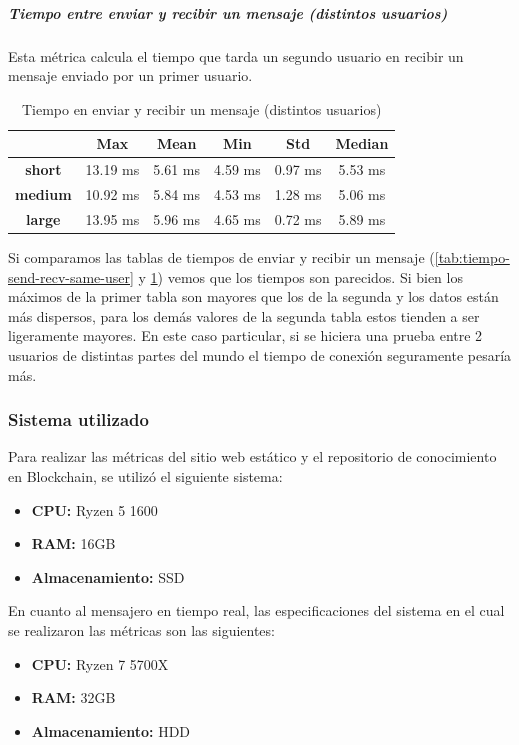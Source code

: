 \subparagraph{Tiempo entre enviar y recibir un mensaje (distintos usuarios)}

Esta métrica calcula el tiempo que tarda un segundo usuario en recibir un mensaje enviado por un primer usuario.

\setlength\tabcolsep{10pt}
\begin{table}[H]
    \centering
    \begin{tabular}{|c|c|c|c|c|c|}
    \hline
    & \textbf{Max} & \textbf{Mean} & \textbf{Min} & \textbf{Std} & \textbf{Median} \\
    \hline
    \textbf{short} & 13.19 ms & 5.61 ms & 4.59 ms & 0.97 ms & 5.53 ms \\
    \hline
    \textbf{medium} & 10.92 ms & 5.84 ms & 4.53 ms & 1.28 ms & 5.06 ms \\
    \hline
    \textbf{large} & 13.95 ms & 5.96 ms & 4.65 ms & 0.72 ms & 5.89 ms \\
    \hline
    \end{tabular}
    \caption{Tiempo en enviar y recibir un mensaje (distintos usuarios)}
    \label{tab:tiempo-send-recv-diff-user}
\end{table}

Si comparamos las tablas de tiempos de enviar y recibir un mensaje (\ref{tab:tiempo-send-recv-same-user} y \ref{tab:tiempo-send-recv-diff-user}) vemos que los tiempos son parecidos. Si bien los máximos de la primer tabla son mayores que los de la segunda y los datos están más dispersos, para los demás valores de la segunda tabla estos tienden a ser ligeramente mayores. En este caso particular, si se hiciera una prueba entre 2 usuarios de distintas partes del mundo el tiempo de conexión seguramente pesaría más.

\subsubsection{Sistema utilizado}

Para realizar las métricas del sitio web estático y el repositorio de conocimiento en Blockchain, se utilizó el siguiente sistema:
\begin{itemize}
    \item \textbf{CPU:} Ryzen 5 1600
    \item \textbf{RAM:} 16GB
    \item \textbf{Almacenamiento:} SSD
\end{itemize}

En cuanto al mensajero en tiempo real, las especificaciones del sistema en el cual se realizaron las métricas son las siguientes:

\begin{itemize}
    \item \textbf{CPU:} Ryzen 7 5700X
    \item \textbf{RAM:} 32GB
    \item \textbf{Almacenamiento:} HDD
\end{itemize}